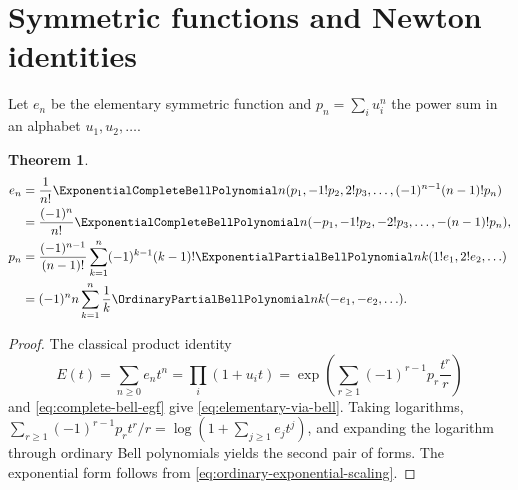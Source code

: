 \documentclass[11pt,a4paper,oneside,openany]{book}
\newtheorem{theorem}{Theorem}[chapter]
\theoremstyle{definition}
\theoremstyle{remark}
\begin{document}
\section{Symmetric functions and Newton identities}
Let $e_n$ be the elementary symmetric function and
$p_n=\sum_i u_i^n$ the power sum in an alphabet $u_1,u_2,\ldots$.
\begin{theorem}\label{thm:bell-symmetric-functions}
\begin{align}
 e_n&=\frac1{n!}\ExponentialCompleteBellPolynomial n(p_1,-1!p_2,2!p_3,\ldots,(-1)^{n-1}(n-1)!p_n)
 \label{eq:elementary-via-bell}\\
 &=\frac{(-1)^n}{n!}\ExponentialCompleteBellPolynomial n(-p_1,-1!p_2,-2!p_3,\ldots,-(n-1)!p_n),
 \notag\\
 p_n&=\frac{(-1)^{n-1}}{(n-1)!}
 \sum_{k=1}^{n}(-1)^{k-1}(k-1)!
 \ExponentialPartialBellPolynomial nk(1!e_1,2!e_2,\ldots)
 \label{eq:powersum-via-bell}\\
 &=(-1)^n n\sum_{k=1}^{n}\frac1k
 \OrdinaryPartialBellPolynomial nk(-e_1,-e_2,\ldots).
 \notag
\end{align}
\end{theorem}
\begin{proof}
The classical product identity
\[
 E(t)=\sum_{n\ge0}e_nt^n=\prod_i(1+u_it)
 =\exp\!\left(\sum_{r\ge1}(-1)^{r-1}p_r\frac{t^r}{r}\right)
\]
and \eqref{eq:complete-bell-egf} give \eqref{eq:elementary-via-bell}.
Taking logarithms,
$\sum_{r\ge1}(-1)^{r-1}p_rt^r/r=\log(1+\sum_{j\ge1}e_jt^j)$, and expanding
the logarithm through ordinary Bell polynomials yields the second pair of forms.
The exponential form follows from \eqref{eq:ordinary-exponential-scaling}.
\end{proof}
\end{document}
